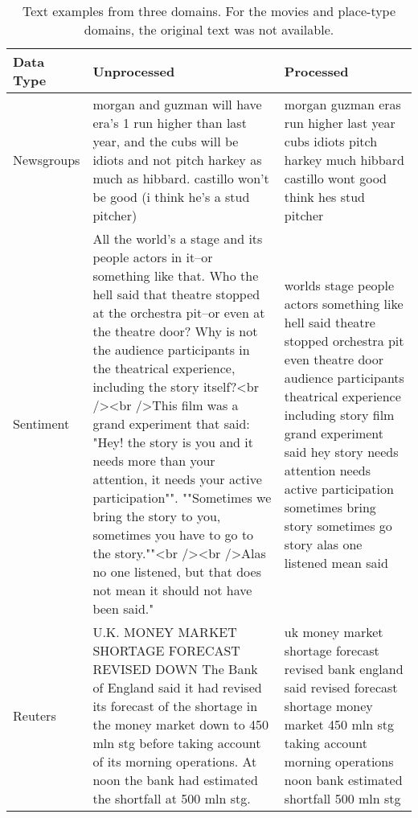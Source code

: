 \begin{table}[] 
	\scriptsize
	\begin{tabular}{lp{6.75cm}p{6.75cm}}
		Data Type  & Unprocessed                                                                                                                                                                                                                                                                                                                                                                               & Processed       \\
		\midrule[\heavyrulewidth]
		Newsgroups & morgan and guzman will have era's 1 run higher than last year, and  the cubs will be idiots and not pitch harkey as much as hibbard.  castillo won't be good (i think he's a stud pitcher)                                                                                                                                                                                                & morgan guzman eras run higher last year cubs idiots pitch harkey much hibbard castillo wont good think hes stud pitcher                            \\
		Sentiment  & All the world's a stage and its people actors in it--or something like that. Who the hell said that theatre stopped at the orchestra pit--or even at the theatre door? 
		Why is not the audience participants in the theatrical experience, including the story itself?<br /><br />This film was a grand experiment that said: "Hey! the story is you and it 
		needs more than your attention, it needs your active participation"". ""Sometimes we bring the story to you, sometimes you have to go to the story.""<br /><br />Alas no one listened, 
		but that does not mean it should not have been said." & worlds stage people actors something like hell said theatre stopped orchestra pit even theatre door audience participants
		theatrical experience including  story film grand experiment said hey story needs attention needs active participation sometimes bring story sometimes go story alas one listened mean
		said \\
		Reuters    & U.K. MONEY MARKET SHORTAGE FORECAST REVISED DOWN The Bank of England said it had revised its forecast of the shortage in the money market down to 450 mln stg before taking account of its morning operations. At noon the bank had estimated the shortfall at 500 mln stg.                                                                                                               & uk money market shortage forecast revised bank england said revised forecast shortage money market 450 mln stg taking account morning operations noon bank estimated shortfall 500 mln stg     \\
	\end{tabular}
	\caption{Text examples from three domains. For the movies and place-type domains, the original text was not available.}\label{ch3:TextExamples}
\end{table}




